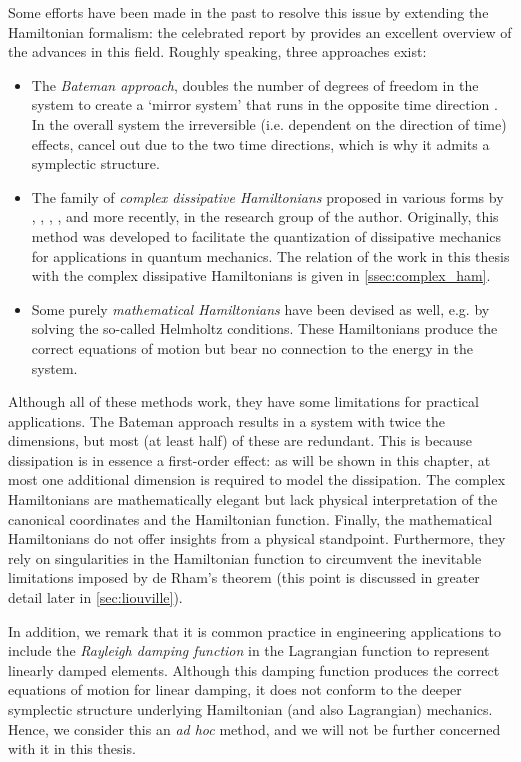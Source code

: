 Some efforts have been made in the past to resolve this issue by extending the Hamiltonian formalism: the celebrated report by \citet{Dekker1981} provides an excellent overview of the advances in this field. Roughly speaking, three approaches exist:
\begin{itemize}
    \item The \emph{Bateman approach}, doubles the number of degrees of freedom in the system to create a `mirror system' that runs in the opposite time direction \cite{Bateman1931}. In the overall system the irreversible (i.e. dependent on the direction of time) effects, cancel out due to the two time directions, which is why it admits a symplectic structure.
    \item The family of \emph{complex dissipative Hamiltonians} proposed in various forms by \citet{Bopp1974}, \citet{Dekker1975}, \citet{Dedene1980}, \citet{Rajeev2007}, and more recently, \citet{Hutters2020} in the research group of the author. Originally, this method was developed to facilitate the quantization of dissipative mechanics for applications in quantum mechanics. The relation of the work in this thesis with the complex dissipative Hamiltonians is given in \cref{ssec:complex_ham}.
    \item Some purely \emph{mathematical Hamiltonians} have been devised as well, e.g. by \citet{Havas1957} solving the so-called Helmholtz conditions. These Hamiltonians produce the correct equations of motion but bear no connection to the energy in the system.
\end{itemize}
Although all of these methods work, they have some limitations for practical applications. The Bateman approach results in a system with twice the dimensions, but most (at least half) of these are redundant. This is because dissipation is in essence a first-order effect: as will be shown in this chapter, at most one additional dimension is required to model the dissipation. The complex Hamiltonians are mathematically elegant but lack physical interpretation of the canonical  coordinates and the Hamiltonian function. Finally, the mathematical Hamiltonians do not offer insights from a physical standpoint. Furthermore, they rely on singularities in the Hamiltonian function to circumvent the inevitable limitations imposed by de Rham's theorem (this point is discussed in greater detail later in \cref{sec:liouville}).

In addition, we remark that it is common practice in engineering applications to include the \emph{Rayleigh damping function} in the Lagrangian function \cite{Goldstein2011} to represent linearly damped elements. Although this damping function produces the correct equations of motion for linear damping, it does not conform to the deeper symplectic structure underlying Hamiltonian (and also Lagrangian) mechanics. Hence, we consider this an \emph{ad hoc} method, and we will not be further concerned with it in this thesis.

